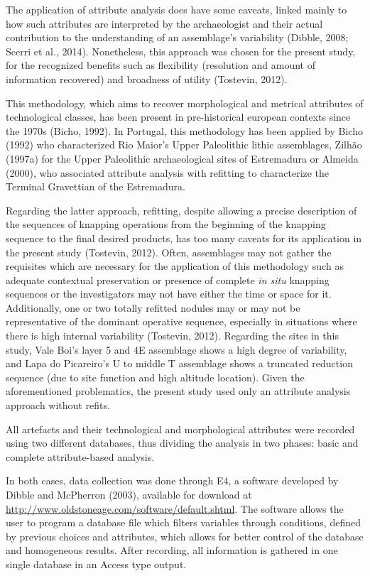 \documentclass[12pt,twoside]{reedthesis}
\begin{document}
The application of attribute analysis does have some caveats, linked mainly to how such attributes are interpreted by the archaeologist and their actual contribution to the understanding of an assemblage's variability (Dibble, 2008; Scerri et al., 2014). Nonetheless, this approach was chosen for the present study, for the recognized benefits such as flexibility (resolution and amount of information recovered) and broadness of utility (Tostevin, 2012).

This methodology, which aims to recover morphological and metrical attributes of technological classes, has been present in pre-historical european contexts since the 1970s (Bicho, 1992). In Portugal, this methodology has been applied by Bicho (1992) who characterized Rio Maior's Upper Paleolithic lithic assemblages, Zilhão (1997a) for the Upper Paleolithic archaeological sites of Estremadura or Almeida (2000), who associated attribute analysis with refitting to characterize the Terminal Gravettian of the Estremadura.

Regarding the latter approach, refitting, despite allowing a precise description of the sequences of knapping operations from the beginning of the knapping sequence to the final desired products, has too many caveats for its application in the present study (Tostevin, 2012). Often, assemblages may not gather the requisites which are necessary for the application of this methodology such as adequate contextual preservation or presence of complete \emph{in situ} knapping sequences or the investigators may not have either the time or space for it. Additionally, one or two totally refitted nodules may or may not be representative of the dominant operative sequence, especially in situations where there is high internal variability (Tostevin, 2012). Regarding the sites in this study, Vale Boi's layer 5 and 4E assemblage shows a high degree of variability, and Lapa do Picareiro's U to middle T assemblage shows a truncated reduction sequence (due to site function and high altitude location). Given the aforementioned problematics, the present study used only an attribute analysis approach without refits.

All artefacts and their technological and morphological attributes were recorded using two different databases, thus dividing the analysis in two phases: basic and complete attribute-based analysis.

In both cases, data collection was done through E4, a software developed by Dibble and McPherron (2003), available for download at \url{http://www.oldstoneage.com/software/default.shtml}. The software allows the user to program a database file which filters variables through conditions, defined by previous choices and attributes, which allows for better control of the database and homogeneous results. After recording, all information is gathered in one single database in an Access type output.
\end{document}
